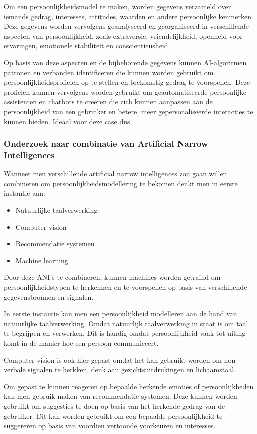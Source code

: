 Om een persoonlijkheidsmodel te maken, worden gegevens verzameld over iemands gedrag, interesses, attitudes, waarden en andere persoonlijke kenmerken. Deze gegevens worden vervolgens geanalyseerd en georganiseerd in verschillende aspecten van persoonlijkheid, zoals extraversie, vriendelijkheid, openheid voor ervaringen, emotionele stabiliteit en consciëntieusheid.

Op basis van deze aspecten en de bijbehorende gegevens kunnen AI-algoritmen patronen en verbanden identificeren die kunnen worden gebruikt om persoonlijkheidsprofielen op te stellen en toekomstig gedrag te voorspellen. Deze profielen kunnen vervolgens worden gebruikt om geautomatiseerde persoonlijke assistenten en chatbots te creëren die zich kunnen aanpassen aan de persoonlijkheid van een gebruiker en betere, meer gepersonaliseerde interacties te kunnen bieden. Ideaal voor deze case dus.

\subsubsection{Onderzoek naar combinatie van Artificial Narrow Intelligences}

Wanneer men verschillende artificial narrow intelligences zou gaan willen combineren om persoonlijkheidsmodellering te bekomen denkt men in eerste instantie aan:

\begin{itemize}
    \item Natuurlijke taalverwerking
    \item Computer vision
    \item Recommendatie systemen
    \item Machine learning
\end{itemize}

Door deze ANI's te combineren, kunnen machines worden getraind om persoonlijkheidstypen te herkennen en te voorspellen op basis van verschillende gegevensbronnen en signalen.

In eerste instantie kan men een persoonlijkheid modelleren aan de hand van natuurlijke taalverwerking. Omdat natuurlijk taalverwerking in staat is om taal te begrijpen en verwerken. Dit is handig omdat persoonlijkheid vaak tot uiting komt in de manier hoe een persoon communiceert.

Computer vision is ook hier gepast omdat het kan gebruikt worden om non-verbale signalen te herkken, denk aan gezichtsuitdrukingen en lichaamstaal.

Om gepast te kunnen reageren op bepaalde herkende emoties of persoonlijkheden kan men gebruik maken van recommendatie systemen. Deze kunnen worden gebruikt om suggesties te doen op basis van het herkende gedrag van de gebruiker. Dit kan worden gebruikt om een bepaalde persoonlijkheid te suggereren op basis van voordien vertoonde voorkeuren en interesses.

